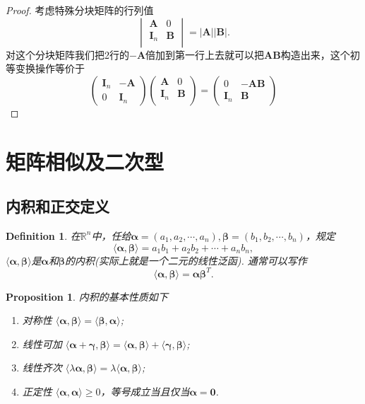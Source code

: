 \documentclass{article}
\newtheorem{proposition}[theorem]{Proposition}
\newtheorem{definition}[theorem]{Definition}
\newcommand{\mbf}[1]{\bm{#1}}
\newcommand\inp[2]{\langle #1, #2 \rangle} %
\begin{document}
\begin{proof}
考虑特殊分块矩阵的行列值
$$
\begin{vmatrix}
\mbf{A} & 0 \\
\mbf{I}_n & \mbf{B} \\
\end{vmatrix} = |\mbf{A}||\mbf{B}|.
$$
对这个分块矩阵我们把2行的$-\mbf{A}$倍加到第一行上去就可以把$\mbf{A}\mbf{B}$构造出来，这个初等变换操作等价于
$$
\begin{pmatrix}
\mbf{I}_n & -\mbf{A} \\
0 & \mbf{I}_n
\end{pmatrix}
\begin{pmatrix}
\mbf{A} & 0 \\
\mbf{I}_n & \mbf{B} \\
\end{pmatrix} = 
\begin{pmatrix}
0 & -\mbf{A}\mbf{B} \\
\mbf{I}_n & \mbf{B} 
\end{pmatrix}
$$
\end{proof}

\newpage
\section{矩阵相似及二次型}

\subsection{内积和正交定义}
\begin{definition}
\rm 在$\mathbb{R}^n$中，任给$\mbf{\alpha}=(a_1,a_2,\cdots,a_n), \mbf{\beta} = (b_1,b_2,\cdots,b_n)$，规定
$$
\inp{\mbf{\alpha}}{\mbf{\beta}} = a_1b_1 + a_2b_2 + \cdots +a_nb_n,
$$
$\inp{\mbf{\alpha}}{\mbf{\beta}}$是$\mbf{\alpha}$和$\mbf{\beta}$的内积(实际上就是一个二元的线性泛函). 通常可以写作
$$
\inp{\mbf{\alpha}}{\mbf{\beta}} = \mbf{\alpha}\mbf{\beta}^{T}.
$$
\end{definition}

\begin{proposition}
\rm 内积的基本性质如下
\begin{enumerate}
	\item 对称性 $\inp{\mbf{\alpha}}{\mbf{\beta}} = \inp{\mbf{\beta}}{\mbf{\alpha}}$;
	\item 线性可加 $\inp{\mbf{\alpha}+\mbf{\gamma}}{\mbf{\beta}} = \inp{\mbf{\alpha}}{\mbf{\beta}} + \inp{\mbf{\gamma}}{\mbf{\beta}}$;
	\item 线性齐次 $\inp{\lambda\mbf{\alpha}}{\mbf{\beta}} = \lambda \inp{\mbf{\alpha}}{\mbf{\beta}}$;
	\item 正定性 $\inp{\mbf{\alpha}}{\mbf{\alpha}} \geq 0$，等号成立当且仅当$\mbf{\alpha} = \mbf{0}$.
\end{enumerate}
\end{proposition}
\end{document}
